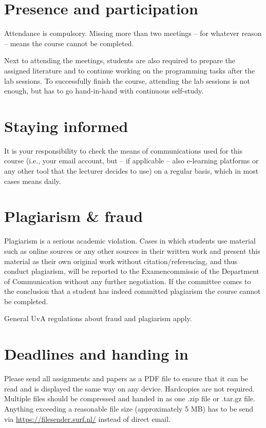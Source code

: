 \documentclass[a4paper,10pt]{report}
\begin{document}
\section{Presence and participation}
Attendance is compulsory. Missing more than two meetings – for whatever reason – means the course cannot be completed.

Next to attending the meetings, students are also required to prepare the assigned literature and to continue working on the programming tasks after the lab sessions. To successfully finish the course, attending the lab sessions is not enough, but has to go hand-in-hand with continuous self-study.

\section{Staying informed}
It is your responsibility to check the means of communications used for this course (i.e., your email account, but – if applicable – also e-learning platforms or any other tool that the lecturer decides to use) on a regular basis, which in most cases means daily.

\section{Plagiarism \& fraud}
Plagiarism is a serious academic violation. Cases in which students use material such as online sources or any other sources in their written work and present this material as their own original work without citation/referencing, and thus conduct plagiarism, will be reported to the Examencommissie of the Department of Communication without any further negotiation. If the committee comes to the conclusion that a student has indeed committed plagiarism the course cannot be completed. 

General UvA regulations about fraud and plagiarism apply.

\section{Deadlines and handing in}
Please send all assignments and papers as a PDF file to ensure that it can be read and is displayed the same way on any device. Hardcopies are not required. Multiple files should be compressed and handed in as one .zip file or .tar.gz file. Anything exceeding a reasonable file size (approximately 5 MB) has to be send via \url{https://filesender.surf.nl/} instead of direct email.
\end{document}
